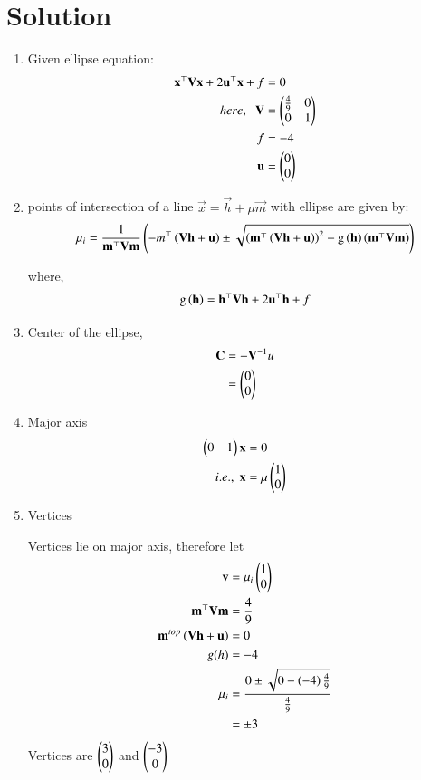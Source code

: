 \documentclass[journal,12pt,twocolumn]{IEEEtran}
\begin{document}
\section{Solution}
\begin{enumerate}

	\item Given ellipse equation:
\begin{align}
	\mathbf{x}^{\top} \mathbf{V} \mathbf{x} + 2 \mathbf{u}^{\top}\mathbf{x} +f &= 0\\
	here,\;\;
	\mathbf{V} &= \begin{pmatrix}\frac{4}{9} & 0\\0&1\end{pmatrix}\\
	f &= -4\\
	\mathbf{u} &= \begin{pmatrix}0\\0\end{pmatrix}
\end{align}

\item points of intersection of a line $\vec{x} = \vec{h}+ \mu\vec{m}$ with ellipse are given by:
\begin{multline}
	\mu_i = \frac{1}{\mathbf{m}^{\top}\mathbf{V}\mathbf{m}} \left(-m^{\top}\left(\mathbf{V}\mathbf{h}+\mathbf{u}\right) \pm \sqrt{\left(\mathbf{m}^{\top}\left(\mathbf{V}\mathbf{h}+\mathbf{u}\right)\right)^2 - \text{g}\left(\mathbf{h}\right)\left(\mathbf{m}^{\top}\mathbf{V}\mathbf{m}\right)}\right)
\end{multline}

where,
\begin{align}
	\text{g}\left(\mathbf{h}\right) = \mathbf{h}^{\top}\mathbf{V}\mathbf{h} + 2\mathbf{u}^{\top}\mathbf{h} +f
\end{align}


\item Center of the ellipse,
	\begin{align}
		\mathbf{C} &= -\mathbf{V}^{-1}u\\
			&= \begin{pmatrix}0\\0\end{pmatrix}
	\end{align}

\item Major axis
	\begin{align}
		\begin{pmatrix}0&1\end{pmatrix}\mathbf{x} &= 0\\
		i.e., \; \mathbf{x} &= \mu \begin{pmatrix}1\\0\end{pmatrix}
	\end{align}
\item Vertices

Vertices lie on major axis, therefore let
\begin{align}
	\mathbf{v} &= {\mu}_i \begin{pmatrix}1\\0\end{pmatrix}\\
	\mathbf{m}^{\top}\mathbf{V}\mathbf{m} &= \frac{4}{9}\\
	\mathbf{m}^{top}\left(\mathbf{V}\mathbf{h}+\mathbf{u}\right) &= 0\\
	g(h) &= -4\\
	{\mu}_i &= \frac{0 \pm \sqrt{0 - \left(-4\right)\frac{4}{9}}}{\frac{4}{9}}\\
		&= \pm 3
\end{align}
Vertices are $\begin{pmatrix}3\\0\end{pmatrix}$ and $\begin{pmatrix}-3\\0\end{pmatrix}$ 


\end{enumerate}
\end{document}
